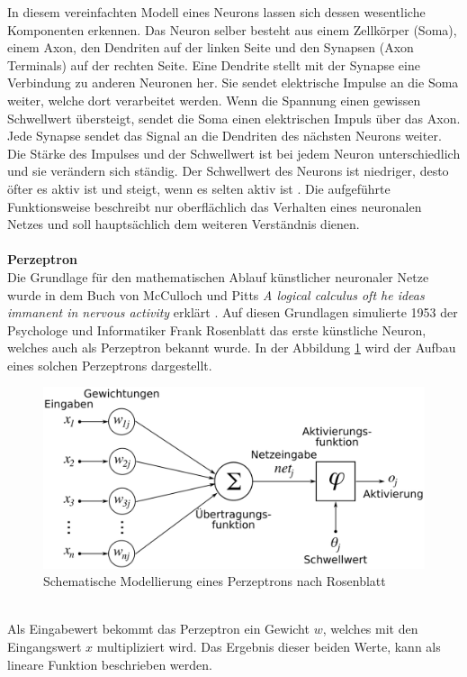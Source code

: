 In diesem vereinfachten Modell eines Neurons lassen sich dessen wesentliche Komponenten erkennen. Das Neuron selber besteht aus einem Zellkörper (Soma), einem Axon, den Dendriten auf der linken Seite und den Synapsen (Axon Terminals) auf der rechten Seite. Eine Dendrite stellt mit der Synapse eine Verbindung zu anderen Neuronen her. Sie sendet elektrische Impulse an die Soma weiter, welche dort verarbeitet werden. Wenn die Spannung einen gewissen Schwellwert übersteigt, sendet die Soma einen elektrischen Impuls über das Axon. Jede Synapse sendet das Signal an die Dendriten des nächsten Neurons weiter. Die Stärke des Impulses und der Schwellwert ist bei jedem Neuron unterschiedlich und sie verändern sich ständig. Der Schwellwert des Neurons ist niedriger, desto öfter es aktiv ist und steigt, wenn es selten aktiv ist \cite{schmidt2013physiologie}. Die aufgeführte Funktionsweise beschreibt nur oberflächlich das Verhalten eines neuronalen Netzes und soll hauptsächlich dem weiteren Verständnis dienen.\\\\
\textbf{Perzeptron}\\
Die Grundlage für den mathematischen Ablauf künstlicher neuronaler Netze wurde in dem Buch von McCulloch und Pitts \textit{A logical calculus oft he ideas immanent in nervous activity} erklärt \cite{McCulloch1943}. Auf diesen Grundlagen simulierte 1953 der Psychologe und Informatiker Frank Rosenblatt das erste künstliche Neuron, welches auch als Perzeptron bekannt wurde. In der Abbildung \ref{img:Perzeptron} wird der Aufbau eines solchen Perzeptrons dargestellt.
\begin{figure}
	[h]
	\centering
	\includegraphics[scale=0.3]{Sources/perzeptron2.png}
	\caption{Schematische Modellierung eines Perzeptrons nach Rosenblatt \cite{perzeptron2019}}
	\label{img:Perzeptron}
\end{figure}\\
Als Eingabewert bekommt das Perzeptron ein Gewicht $w$, welches mit den Eingangswert $x$ multipliziert wird. Das Ergebnis dieser beiden Werte, kann als lineare Funktion beschrieben werden.
